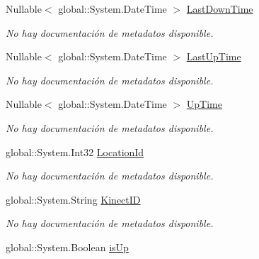 \begin{DoxyCompactItemize}
Nullable$<$ global\-::\-System.\-Date\-Time $>$ \hyperlink{class_game_memory_1_1_advert_hosts_ae2a1fcae997b086b7029ae2739f69a8a}{Last\-Down\-Time}
\begin{DoxyCompactList}\small\item\em No hay documentación de metadatos disponible. \end{DoxyCompactList}\item 
Nullable$<$ global\-::\-System.\-Date\-Time $>$ \hyperlink{class_game_memory_1_1_advert_hosts_ac9286ac99bf2f9237cdf0ade0823ad81}{Last\-Up\-Time}
\begin{DoxyCompactList}\small\item\em No hay documentación de metadatos disponible. \end{DoxyCompactList}\item 
Nullable$<$ global\-::\-System.\-Date\-Time $>$ \hyperlink{class_game_memory_1_1_advert_hosts_a60aaa40a77a9d9a4df8f3e05df660496}{Up\-Time}
\begin{DoxyCompactList}\small\item\em No hay documentación de metadatos disponible. \end{DoxyCompactList}\item 
global\-::\-System.\-Int32 \hyperlink{class_game_memory_1_1_advert_hosts_a001106f5700ae6ddd8db5d749eeceb52}{Location\-Id}
\begin{DoxyCompactList}\small\item\em No hay documentación de metadatos disponible. \end{DoxyCompactList}\item 
global\-::\-System.\-String \hyperlink{class_game_memory_1_1_advert_hosts_ac6a05cfb2749577b3b7918777ef0f820}{Kinect\-I\-D}
\begin{DoxyCompactList}\small\item\em No hay documentación de metadatos disponible. \end{DoxyCompactList}\item 
global\-::\-System.\-Boolean \hyperlink{class_game_memory_1_1_advert_hosts_a8d5395f4cef95ff9558134b2c37feb6b}{is\-Up}

\end{DoxyCompactItemize}
